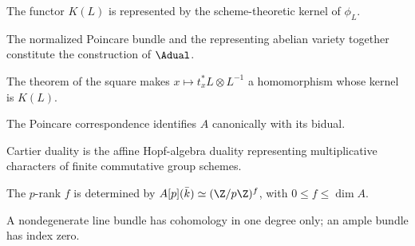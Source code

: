\begin{remark}
\label{mumford3-kernel-line-bundle}
The functor $K(L)$ is represented by the scheme-theoretic kernel of $\phi_L$.
\notready
\end{remark}

\begin{remark}
\label{mumford3-dual-construction}
The normalized Poincare bundle and the representing abelian variety together
constitute the construction of $\Adual$.
\notready
\end{remark}

\begin{remark}
\label{mumford3-phi-l-morphism}
The theorem of the square makes $x\mapsto t_x^*L\otimes L^{-1}$ a homomorphism
whose kernel is $K(L)$.
\notready
\end{remark}

\begin{corollary}
\label{mumford3-duality-hypothesis}
The Poincare correspondence identifies $A$ canonically with its bidual.
\notready
\end{corollary}

\begin{remark}
\label{mumford3-cartier-dual}
Cartier duality is the affine Hopf-algebra duality representing multiplicative
characters of finite commutative group schemes.
\notready
\end{remark}

\begin{definition}[$p$-rank]
\label{mumford3-p-rank}
The $p$-rank $f$ is determined by
$A[p](\bar k)\simeq(\Z/p\Z)^f$, with $0\leq f\leq\dim A$.
\notready
\end{definition}

\begin{theorem}
\label{mumford3-vanishing-theorem}
A nondegenerate line bundle has cohomology in one degree only; an ample bundle
has index zero.
\notready
\end{theorem}


